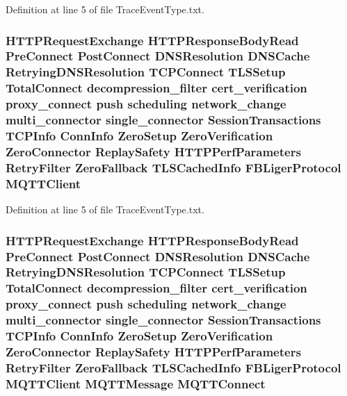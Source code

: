 Definition at line 5 of file Trace\+Event\+Type.\+txt.

\subsubsection[{M\+Q\+T\+T\+Client}]{ H\+T\+T\+P\+Request\+Exchange H\+T\+T\+P\+Response\+Body\+Read {\bf Pre\+Connect} {\bf Post\+Connect} D\+N\+S\+Resolution D\+N\+S\+Cache Retrying\+D\+N\+S\+Resolution T\+C\+P\+Connect T\+L\+S\+Setup {\bf Total\+Connect} decompression\+\_\+filter cert\+\_\+verification proxy\+\_\+connect push scheduling network\+\_\+change multi\+\_\+connector single\+\_\+connector {\bf Session\+Transactions} {\bf T\+C\+P\+Info} {\bf Conn\+Info} {\bf Zero\+Setup} {\bf Zero\+Verification} {\bf Zero\+Connector} {\bf Replay\+Safety} {\bf H\+T\+T\+P\+Perf\+Parameters} {\bf Retry\+Filter} {\bf Zero\+Fallback} {\bf T\+L\+S\+Cached\+Info} {\bf F\+B\+Liger\+Protocol} M\+Q\+T\+T\+Client}\label{TraceEventType_8txt_a9815075ba7f039331c8e15bf2366a2f7}


Definition at line 5 of file Trace\+Event\+Type.\+txt.

\subsubsection[{M\+Q\+T\+T\+Connect}]{ H\+T\+T\+P\+Request\+Exchange H\+T\+T\+P\+Response\+Body\+Read {\bf Pre\+Connect} {\bf Post\+Connect} D\+N\+S\+Resolution D\+N\+S\+Cache Retrying\+D\+N\+S\+Resolution T\+C\+P\+Connect T\+L\+S\+Setup {\bf Total\+Connect} decompression\+\_\+filter cert\+\_\+verification proxy\+\_\+connect push scheduling network\+\_\+change multi\+\_\+connector single\+\_\+connector {\bf Session\+Transactions} {\bf T\+C\+P\+Info} {\bf Conn\+Info} {\bf Zero\+Setup} {\bf Zero\+Verification} {\bf Zero\+Connector} {\bf Replay\+Safety} {\bf H\+T\+T\+P\+Perf\+Parameters} {\bf Retry\+Filter} {\bf Zero\+Fallback} {\bf T\+L\+S\+Cached\+Info} {\bf F\+B\+Liger\+Protocol} {\bf M\+Q\+T\+T\+Client} {\bf M\+Q\+T\+T\+Message} M\+Q\+T\+T\+Connect}\label{TraceEventType_8txt_aa35f3be1543ba3515162189e3a4eefc7}


